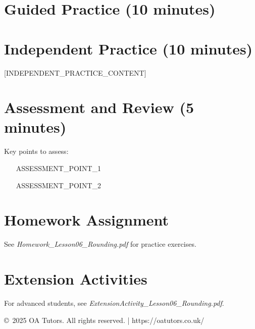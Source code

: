 \documentclass[a4paper,12pt]{article}
\begin{document}
\section{Guided Practice (10 minutes)}
\begin{activity}
\end{activity}

\section{Independent Practice (10 minutes)}
[INDEPENDENT_PRACTICE_CONTENT]

\section{Assessment and Review (5 minutes)}
\begin{note}
Key points to assess:
\begin{itemize}
    \item [ASSESSMENT_POINT_1]
    \item [ASSESSMENT_POINT_2]
\end{itemize}
\end{note}

\section{Homework Assignment}
See \textit{Homework\_Lesson06\_Rounding.pdf} for practice exercises.

\section{Extension Activities}
For advanced students, see \textit{ExtensionActivity\_Lesson06\_Rounding.pdf}.

\vfill
\begin{center}
\textcolor{oagray}{\small \copyright\ 2025 OA Tutors. All rights reserved. | https://oatutors.co.uk/}
\end{center}
\end{document}
